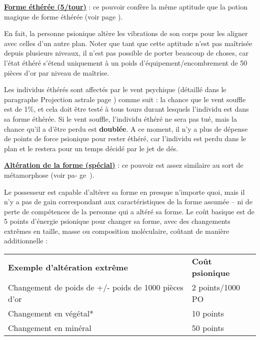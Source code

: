 \bigskip

\label{magicien-forme-etheree}\textbf{\uline{Forme éthérée (5/tour)}} : ce pouvoir confère la même aptitude que la potion magique de forme éthérée (voir page \pageref{objet-huile-etheree}).

\bigskip

En fait, la personne psionique altère les vibrations de son corps pour les aligner avec celles d'un autre plan. Noter que tant que cette aptitude n'est pas maîtrisée depuis plusieurs niveaux, il n'est pas possible de porter beaucoup de choses, car l'état éthéré s'étend uniquement à un poids d'équipement/encombrement de 50 pièces d'or par niveau de maîtrise.

\bigskip

Les individus éthérés sont affectés par le vent psychique (détaillé dans le paragraphe Projection astrale page \pageref{guerrier-projection-astrale}) comme suit : la chance que le vent souffle est de 1\%, et cela doit être testé à tous tours durant lesquels l'individu est dans sa forme éthérée. Si le vent souffle, l'individu éthéré ne sera pas tué, mais la chance qu'il a d'être perdu est \textbf{doublée}. A ce moment, il n'y a plus de dépense de points de force psionique pour rester éthéré, car l'individu est perdu dans le plan et le restera pour un temps décidé par le jet de dés.

\bigskip

\label{magicien-alteration-forme}\textbf{\uline{Altération de la forme (spécial)}} : ce pouvoir est assez similaire au sort de métamorphose (voir pa- ge~\pageref{sort-metamorphose}).

\bigskip

Le possesseur est capable d'altérer sa forme en presque n'importe quoi, mais il n'y a pas de gain correspondant aux caractéristiques de la forme assumée -- ni de perte de compétences de la personne qui a altéré sa forme. Le coût basique est de 5 points d'énergie psionique pour changer sa forme, avec des changements extrêmes en taille, masse ou composition moléculaire, coûtant de manière additionnelle :

\bigskip

\begin{tabular}{ll}
\textbf{Exemple d'altération extrême} & \textbf{Coût psionique} \\
Changement de poids de +/- poids de 1000 pièces d'or & 2 points/1000 PO \\
Changement en végétal* & 10 points \\
Changement en minéral & 50 points \\
\end{tabular}

